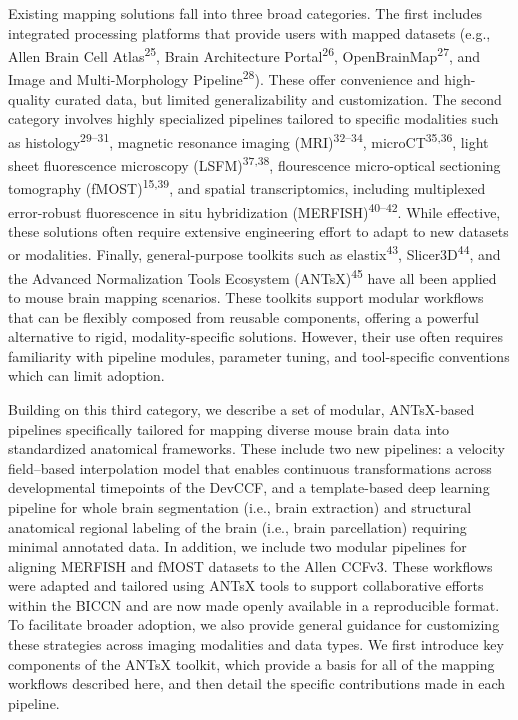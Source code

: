 \documentclass[
  12pt,
]{article}
\begin{document}
Existing mapping solutions fall into three broad categories. The first
includes integrated processing platforms that provide users with mapped
datasets (e.g., Allen Brain Cell Atlas\textsuperscript{25}, Brain
Architecture Portal\textsuperscript{26},
OpenBrainMap\textsuperscript{27}, and Image and Multi-Morphology
Pipeline\textsuperscript{28}). These offer convenience and high-quality
curated data, but limited generalizability and customization. The second
category involves highly specialized pipelines tailored to specific
modalities such as histology\textsuperscript{29--31}, magnetic resonance
imaging (MRI)\textsuperscript{32--34}, microCT\textsuperscript{35,36},
light sheet fluorescence microscopy (LSFM)\textsuperscript{37,38},
flourescence micro-optical sectioning tomography
(fMOST)\textsuperscript{15,39}, and spatial transcriptomics, including
multiplexed error-robust fluorescence in situ hybridization
(MERFISH)\textsuperscript{40--42}. While effective, these solutions
often require extensive engineering effort to adapt to new datasets or
modalities. Finally, general-purpose toolkits such as
elastix\textsuperscript{43}, Slicer3D\textsuperscript{44}, and the
Advanced Normalization Tools Ecosystem (ANTsX)\textsuperscript{45} have
all been applied to mouse brain mapping scenarios. These toolkits
support modular workflows that can be flexibly composed from reusable
components, offering a powerful alternative to rigid, modality-specific
solutions. However, their use often requires familiarity with pipeline
modules, parameter tuning, and tool-specific conventions which can limit
adoption.

Building on this third category, we describe a set of modular,
ANTsX-based pipelines specifically tailored for mapping diverse mouse
brain data into standardized anatomical frameworks. These include two
new pipelines: a velocity field--based interpolation model that enables
continuous transformations across developmental timepoints of the
DevCCF, and a template-based deep learning pipeline for whole brain
segmentation (i.e., brain extraction) and structural anatomical regional
labeling of the brain (i.e., brain parcellation) requiring minimal
annotated data. In addition, we include two modular pipelines for
aligning MERFISH and fMOST datasets to the Allen CCFv3. These workflows
were adapted and tailored using ANTsX tools to support collaborative
efforts within the BICCN and are now made openly available in a
reproducible format. To facilitate broader adoption, we also provide
general guidance for customizing these strategies across imaging
modalities and data types. We first introduce key components of the
ANTsX toolkit, which provide a basis for all of the mapping workflows
described here, and then detail the specific contributions made in each
pipeline.
\end{document}
